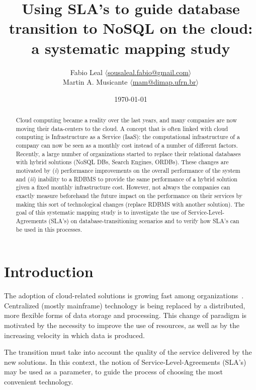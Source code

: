 \documentclass{article}
\begin{document}
\title{Using SLA’s to guide database transition to NoSQL on the cloud: a systematic mapping study}
\author{Fabio Leal $\langle$\href{mailto:sousaleal.fabio@gmail.com}%
{sousaleal.fabio@gmail.com}$\rangle$
\\
Martin A. Musicante $\langle$\href{mailto:mam@dimap.ufrn.br}%
{mam@dimap.ufrn.br}$\rangle$}
\date{\today}
\maketitle  




\begin{abstract}
Cloud computing became a reality over the last years, and many companies are now moving their data-centers to the cloud. 
A concept that is often linked with cloud computing is Infrastructure as a Service (IaaS): the computational infrastructure of a company can now be seen as a monthly cost instead of a number of different factors. 
Recently, a large number of organizations started to replace their relational databases with hybrid solutions (NoSQL DBs, Search Engines, ORDBs). 
These changes are motivated by (\textit{i}) performance improvements on the overall performance of the system and (\textit{ii}) inability to a RDBMS to provide the same performance of a hybrid solution given a fixed monthly infrastructure cost. 
However, not always the companies can exactly measure beforehand the future impact on the performance on their services by making this sort of technological changes (replace RDBMS with another solution). 
The goal of this systematic mapping study is to investigate the use of Service-Level-Agreements (SLA’s) on database-transitioning scenarios and to verify how SLA’s can be used in this processes.
\end{abstract}

\section{Introduction}

The adoption of cloud-related solutions is growing fast among organizations~\cite{6546068}.
Centralized (mostly mainframe) technology is being replaced by a distributed, more flexible forms of data storage and processing.
This change of paradigm is motivated by the necessity to improve the use of resources, as well as by the increasing velocity in which data is produced.

The transition must take into account the quality of the service delivered by the new solutions.
In this context, the notion of Service-Level-Agreements (SLA’s)~\cite{6253526} may be used as a parameter, to guide the process of choosing the most convenient technology.
\end{document}
